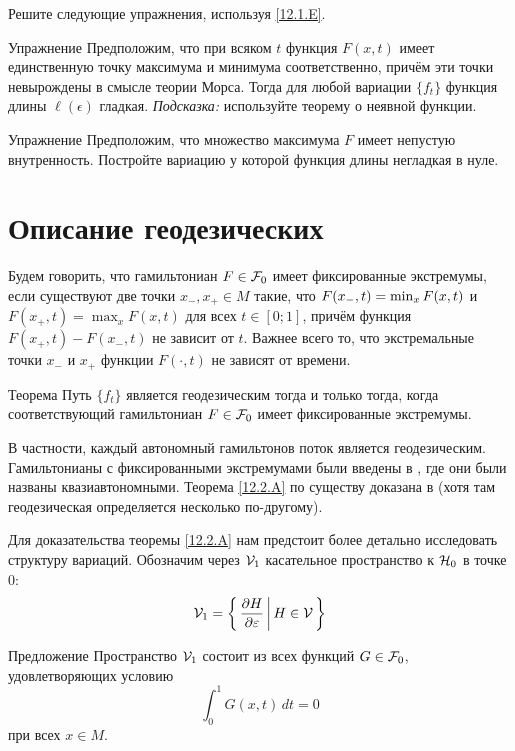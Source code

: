 Решите следующие упражнения, используя \ref{12.1.E}.

\begin{ex}{Упражнение}\label{12.1.F}
Предположим, что при всяком $t$ функция $F(x, t)$ имеет единственную точку максимума и минимума соответственно, причём эти точки невырождены в смысле теории Морса.
Тогда для любой вариации $\{f_t\}$ функция длины $\ell(\epsilon)$ гладкая.
\emph{Подсказка:} используйте теорему о неявной функции.
\end{ex}

\begin{ex}{Упражнение}\label{12.1.G}
Предположим, что множество максимума $F$ имеет непустую внутренность.
Постройте вариацию у которой функция длины негладкая в нуле.
\end{ex}

\section{Описание геодезических}\label{sec:12.2}

Будем говорить, что гамильтониан $F\in \mathcal{F}_0$ имеет фиксированные экстремумы, если существуют две точки $x_-, x_+\in M$ такие, что $F(x_-, t) \z= \min_x F(x, t)$ и $F(x_+, t) = \max_x F (x, t)$ для всех $t\in[0; 1]$, причём функция $F(x_+, t) - F(x_-, t)$ не зависит от $t$.
Важнее всего то, что экстремальные точки $x_-$ и $x_+$ функции $F(\cdot, t)$ не зависят от времени.

\begin{thm}{Теорема}\label{12.2.A}
Путь $\{f_t\}$ является геодезическим тогда и только тогда, когда соответствующий гамильтониан $F\in\mathcal{F}_0$ имеет фиксированные экстремумы.
\end{thm}

В частности, каждый автономный гамильтонов поток является геодезическим.
Гамильтонианы с фиксированными экстремумами были введены в \cite{BP1}, где они были названы квазиавтономными.
Теорема \ref{12.2.A} по существу доказана в \cite{LM2} (хотя там геодезическая определяется несколько по-другому).

Для доказательства теоремы \ref{12.2.A} нам предстоит более детально исследовать структуру вариаций.
Обозначим через $\mathcal{V}_1$ касательное пространство к $\mathcal{H}_0$ в точке $0$: 
\[\mathcal{V}_1=\left\{ \,{\frac{\partial H}{\partial\varepsilon}}\, \middle| \,{H\in \mathcal{V}}\, \right\}\]

\begin{thm}{Предложение}\label{12.2.B}
Пространство $\mathcal{V}_1$ состоит из всех функций $G\in\mathcal{F}_0$, удовлетворяющих условию
\[\int_0^1G(x,t)\,dt=0\]
при всех $x\in M$.
\end{thm}


